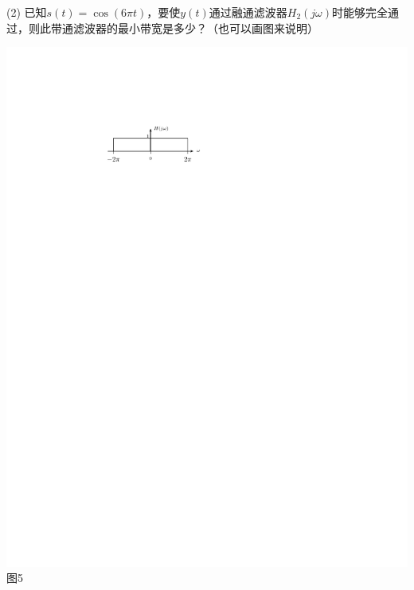 \documentclass[11pt]{ctexart}
\begin{document}
\begin{enumerate}[leftmargin=0em]
(2) 已知$s(t)=\cos(6\pi t)$，要使$y(t)$通过融通滤波器$H_2(j\omega)$时能够完全通过，则此带通滤波器的最小带宽是多少？（也可以画图来说明）\par
\begin{center}
	\includegraphics{img/14-2-3.pdf}\\
{图5}
\end{center}
\vfill\newpage
%
%

\end{enumerate}
\end{document}
